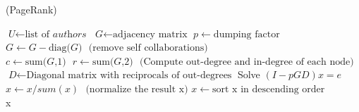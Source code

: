 \documentclass[]{usiinfbachelorproject}
\begin{document}
\begin{algorithm}
\caption{ (PageRank)}\label{pagerank}
\begin{algorithmic}[1]
\State $\textit{U} \gets \text{list of }\textit{authors}$
\State $\textit{G} \gets \text{adjacency matrix}$
\State $p \gets \text{dumping factor}$
\State $\textit{G} \gets \textit{G} - \text{diag(}\textit{G}\text{)} \: \: \: \text{(remove self collaborations)}$
\State $\textit{c} \gets \text{sum(}\textit{G}\text{,1)} \:\:\: \textit{r} \gets \text{sum(}\textit{G}\text{,2)} \:\:\: \text{(Compute out-degree and in-degree of each node)}$
\State $\textit{D} \gets \text{Diagonal matrix with reciprocals of out-degrees}$
\State Solve $(I - pGD)x = e$
\State $x \gets x / sum(x) \: \:\: \text{(normalize the result x)}$
\State $x \gets \text{sort x in descending order}$\\
\Return x
\EndProcedure
\end{algorithmic}
\end{algorithm}
\end{document}
